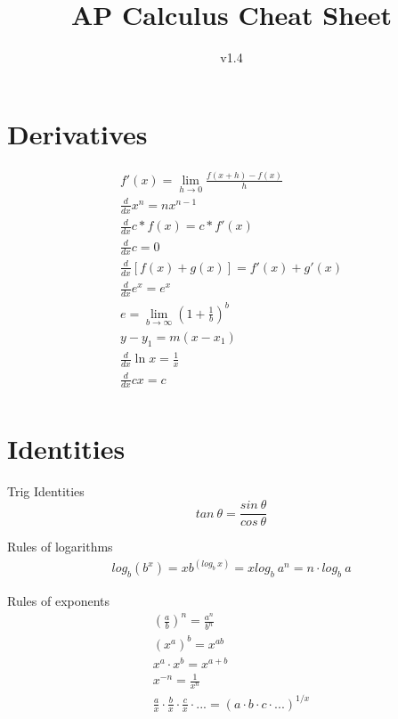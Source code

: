 \documentclass[12pt, english]{article}
\date{}
\title{ AP Calculus Cheat Sheet }
\begin{document}
\author{
	v1.4
}

\maketitle

\section{Derivatives}
\begin{equation*}
\begin{aligned}
	f'(x) = \lim_{h \to 0} \frac{f(x+h)-f(x)}{h} \\
	\frac{d}{dx} x^n = nx^{n-1} \\
	\frac{d}{dx} c * f(x) = c * f'(x) \\
	\frac{d}{dx} c = 0 \\
	\frac{d}{dx} [f(x)+g(x)] = f'(x)+g'(x) \\
	\frac{d}{dx} e^x = e^x \\
	e = \lim_{b \to \infty} (1+\frac{1}{b})^b \\
	y-y_1 = m(x-x_1) \\
	\frac{d}{dx} \ln x = \frac{1}{x} \\
	\frac{d}{dx} cx = c \\
\end{aligned}
\end{equation*}

\section{Identities}
Trig Identities
\begin{equation}
	tan\ \theta = \frac{sin\ \theta}{cos\ \theta}
\end{equation}

Rules of logarithms 
\begin{equation}
\begin{aligned}
	log_b (b^x) = x
	b^{(log_{b}\ x)} = x
	log_{b}\ a^n = n \cdot log_b\ a
\end{aligned}
\end{equation}

Rules of exponents 
\begin{equation}
\begin{aligned}
	\left(\frac{a}{b}\right)^n = \frac{a^n}{b^n} \\
	(x^a)^b = x^{ab} \\
	x^a \cdot x^b = x^{a + b} \\
	x^{-n} = \frac{1}{x^n} \\
	\frac{a}{x} \cdot \frac{b}{x} \cdot \frac{c}{x} \cdot ... = (a \cdot b \cdot c \cdot ...)^{1/x} \\
\end{aligned}
\end{equation}
\end{document}
